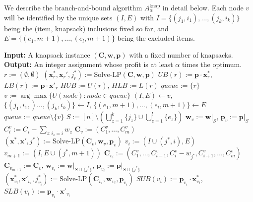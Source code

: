 \documentclass[moor,sglanonrev]{informs4}
\theoremstyle{plain}
\begin{document}
\begin{APPENDICES}
We describe the branch-and-bound algorithm $A^{\text{knap}}_{\alpha}$ in detail below. Each node $v$ will be identified by the unique sets $(I, E)$ with $I = \{(j_1,i_1), \ldots, (j_k, i_k)\}$ being the (item, knapsack) inclusions fixed so far, and $E=\{(e_1,m+1), \ldots, (e_l,m+1)\}$ being the excluded items.

\begin{algorithm}
\caption{$A^{\text{knap}}_{\alpha}$. The subroutine Solve-LP returns the triple of optimal fractional solution, its rounded-up integer solution and the most profitable critical item.}
\label{alg:knapsack}
\footnotesize
\begin{algorithmic}[1]
    \State \textbf{Input:} A knapsack instance $(\bm{C}, \bm{w}, \bm{p})$ with a fixed number of knapsacks.
    \State \textbf{Output:} An integer assignment whose profit is at least $\alpha$ times the optimum.
    \State $r := (\emptyset, \emptyset)$
    \State $(\bm{x}^* _r, \bm{x}_r ', j^* _r) := \text{Solve-LP}(\bm{C, \bm{w}, \bm{p}})$
    \State $UB(r):= \bm{p}\cdot \bm{x}^* _r$, $LB(r):= \bm{p}\cdot \bm{x}' _r$
    \State $HUB := U(r)$, $HLB := L(r)$
    \State $queue :=  \{r\}$
        \State $v := \arg\max \{U(node): node \in queue\}$
        \State $(I, E) \leftarrow v$, $\{(j_1, i_1, )\ldots, (j_k, i_k)\} \leftarrow I$, $\{(e_1, m+1), \ldots, (e_l, m+1)\} \leftarrow E$
        \State $queue := queue \setminus \{v\}$
        \State $S := [n]\setminus \left(\bigcup_{z=1}^k \{j_z\} \cup \bigcup_{z=1}^l \{e_z\}\right)$
        \State $\bm{w}_v := \bm{w}|_{S}$, $\bm{p}_v := \bm{p}|_{S}$
            \State $C^v_i := C_i - \sum\limits_{z: i_z = i} w_z$
        \EndFor
        \State $\bm{C}_v := (C^v _1, \ldots, C^v _m)$
        \State $(\bm{x^*}, \bm{x}', j^*):= \text{Solve-LP}(\bm{C}_v, \bm{w}_v, \bm{p}_v)$
            \State $v_i := (I\cup (j^*, i), E)$
        \EndFor
        \State $v_{m+1} := (I, E\cup (j^*, m+1))$
            \State $\bm{C}_{v_i} := (C^v _1, \ldots, C^v _{i-1}, C^v_i - w_{j^*}, C^v_{i+1}, \ldots, C^v_m)$
        \EndFor
        \State $\bm{C}_{v_{m+1}} := \bm{C}_v$, 
            \State $\bm{w}_{v_i} := \bm{w} |_{S \cup \{j^*\}}$, $\bm{p}_{v_i} := \bm{p} |_{S \cup \{j^*\}}$
            \State $(\bm{x}^* _{v_i}, \bm{x}' _{v_i}, j^*_{v_i}) := \text{Solve-LP}(\bm{C}_{v_i}, \bm{w}_{v_i}, \bm{p}_{v_i})$
            \State $SUB(v_i) := \bm{p}_{v_i} \cdot \bm{x}^* _{v_i}$, $SLB(v_i) := \bm{p}_{v_i} \cdot \bm{x}' _{v_i}$

\end{algorithmic}
\end{algorithm}
\end{APPENDICES}
\end{document}
